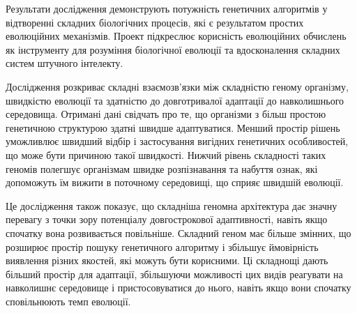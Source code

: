Результати дослідження демонструють потужність генетичних алгоритмів 
у відтворенні складних біологічних процесів, 
які є результатом простих еволюційних механізмів. 
Проект підкреслює корисність еволюційних обчислень як інструменту 
для розуміння біологічної еволюції та 
вдосконалення складних систем штучного інтелекту.





Дослідження розкриває складні взаємозв'язки між складністю геному 
організму, швидкістю еволюції та здатністю до довготривалої адаптації 
до навколишнього середовища. 
Отримані дані свідчать про те, 
що організми з більш простою генетичною структурою здатні 
швидше адаптуватися. 
Менший простір рішень уможливлює швидший відбір і 
застосування вигідних генетичних особливостей, 
що може бути причиною такої швидкості. 
Нижчий рівень складності таких геномів полегшує організмам 
швидке розпізнавання та набуття ознак, 
які допоможуть їм вижити в поточному середовищі, 
що сприяє швидшій еволюції.

Це дослідження також показує, 
що складніша геномна архітектура дає значну перевагу з 
точки зору потенціалу довгострокової адаптивності, 
навіть якщо спочатку вона розвивається повільніше. 
Складний геном має більше змінних, 
що розширює простір пошуку генетичного алгоритму 
і збільшує ймовірність виявлення різних якостей, 
які можуть бути корисними. 
Ці складнощі дають більший простір для адаптації, 
збільшуючи можливості цих видів реагувати на навколишнє середовище 
і пристосовуватися до нього, 
навіть якщо вони спочатку сповільнюють темп еволюції.


